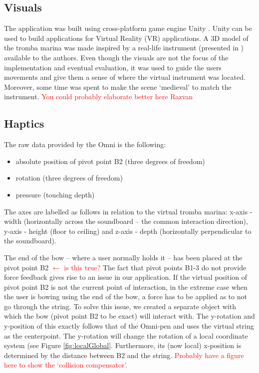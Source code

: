 \documentclass[dvipsnames, pdftex]{article}
\def\SWcomment[#1]{\textcolor{Red}{#1}}
\begin{document}
\subsection{Visuals}
The application was built using cross-platform game engine Unity \cite{unity}. Unity can be used to build applications for Virtual Reality (VR) applications. A 3D model of the tromba marina was made inspired by a real-life instrument (presented in \cite{Baldwin2016}) available to the authors. Even though the visuals are not the focus of the implementation and eventual evaluation, it was used to guide the users movements and give them a sense of where the virtual instrument was located. Moreover, some time was spent to make the scene `medieval' to match the instrument. \SWcomment[You could probably elaborate better here Razvan]

\subsection{Haptics}
The raw data provided by the Omni is the following:
\begin{itemize}
    \item absolute position of pivot point B2 (three degrees of freedom)
    \item rotation (three degrees of freedom)
    \item pressure (touching depth)
\end{itemize}
%
The axes are labelled as follows in relation to the virtual tromba marina: x-axis - width (horizontally across the soundboard -- the common interaction direction), y-axis - height (floor to ceiling) and z-axis - depth (horizontally perpendicular to the soundboard).


The end of the bow -- where a user normally holds it -- has been placed at the pivot point B2 \SWcomment[$\leftarrow$ is this true?]
The fact that pivot points B1-3 do not provide force feedback gives rise to an issue in our application. If the virtual
position of pivot point B2 is not the current point of interaction, in the extreme case when the user is bowing using the end of the bow, a force has to be applied as to not go through the string. To solve this issue, we created a separate object with which the bow (pivot point B2 to be exact) will interact with. The y-rotation and y-position of this exactly follows that of the Omni-pen and uses the virtual string as the centerpoint. The y-rotation will change the rotation of a local coordinate system (see Figure \ref{fig:localGlobal}. Furthermore, its (now local) x-position is determined by the distance between B2 and the string. \SWcomment[Probably have a figure here to show the `collision compensator'.]
\end{document}
